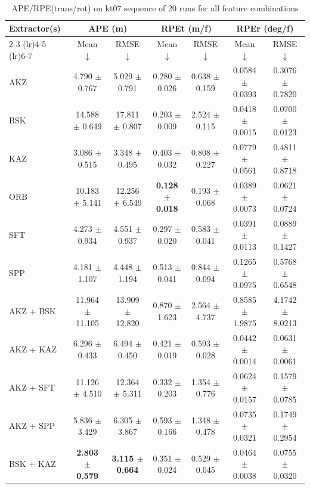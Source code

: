 \begin{table}[hbp]
\centering
\caption{APE/RPE(trans/rot) on kt07 sequence of 20 runs for all feature combinations}
\scriptsize
\label{tab:kt07_ape_rpe}\
\setlength{\tabcolsep}{3pt}
\begin{tabular}{lcccccc}
\toprule
\textbf{Extractor(s)}
& \multicolumn{2}{c}{\textbf{APE (m)}}
& \multicolumn{2}{c}{\textbf{RPEt (m/f)}}
& \multicolumn{2}{c}{\textbf{RPEr (deg/f)}} \\
\cmidrule(lr){2-3} \cmidrule(lr){4-5} \cmidrule(lr){6-7}
& Mean $\downarrow$ & RMSE $\downarrow$
& Mean $\downarrow$ & RMSE $\downarrow$
& Mean $\downarrow$ & RMSE $\downarrow$ \\
\midrule
AKZ & 4.790 $\pm$ 0.767 & 5.029 $\pm$ 0.791 & 0.280 $\pm$ 0.026 & 0.638 $\pm$ 0.159 & 0.0584 $\pm$ 0.0393 & 0.3076 $\pm$ 0.7820 \\
BSK & 14.588 $\pm$ 0.649 & 17.811 $\pm$ 0.807 & 0.203 $\pm$ 0.009 & 2.524 $\pm$ 0.115 & 0.0418 $\pm$ 0.0015 & 0.0700 $\pm$ 0.0123 \\
KAZ & 3.086 $\pm$ 0.515 & 3.348 $\pm$ 0.495 & 0.403 $\pm$ 0.032 & 0.808 $\pm$ 0.227 & 0.0779 $\pm$ 0.0561 & 0.4811 $\pm$ 0.8718 \\
ORB & 10.183 $\pm$ 5.141 & 12.256 $\pm$ 6.549 & \textbf{0.128 $\pm$ 0.018} & 0.193 $\pm$ 0.068 & 0.0389 $\pm$ 0.0073 & 0.0621 $\pm$ 0.0724 \\
SFT & 4.273 $\pm$ 0.934 & 4.551 $\pm$ 0.937 & 0.297 $\pm$ 0.020 & 0.583 $\pm$ 0.041 & 0.0391 $\pm$ 0.0113 & 0.0889 $\pm$ 0.1427 \\
SPP & 4.181 $\pm$ 1.107 & 4.448 $\pm$ 1.194 & 0.513 $\pm$ 0.041 & 0.844 $\pm$ 0.094 & 0.1265 $\pm$ 0.0975 & 0.5768 $\pm$ 0.6548 \\
AKZ + BSK & 11.964 $\pm$ 11.105 & 13.909 $\pm$ 12.820 & 0.870 $\pm$ 1.623 & 2.564 $\pm$ 4.737 & 0.8585 $\pm$ 1.9875 & 4.1742 $\pm$ 8.0213 \\
AKZ + KAZ & 6.296 $\pm$ 0.433 & 6.494 $\pm$ 0.450 & 0.421 $\pm$ 0.019 & 0.593 $\pm$ 0.028 & 0.0442 $\pm$ 0.0014 & 0.0631 $\pm$ 0.0061 \\
AKZ + SFT & 11.126 $\pm$ 4.510 & 12.364 $\pm$ 5.311 & 0.332 $\pm$ 0.203 & 1.354 $\pm$ 0.776 & 0.0624 $\pm$ 0.0157 & 0.1579 $\pm$ 0.0785 \\
AKZ + SPP & 5.836 $\pm$ 3.429 & 6.305 $\pm$ 3.867 & 0.593 $\pm$ 0.166 & 1.348 $\pm$ 0.478 & 0.0735 $\pm$ 0.0321 & 0.1749 $\pm$ 0.2954 \\
BSK + KAZ & \textbf{2.803 $\pm$ 0.579} & \textbf{3.115 $\pm$ 0.664} & 0.351 $\pm$ 0.024 & 0.529 $\pm$ 0.045 & 0.0464 $\pm$ 0.0038 & 0.0755 $\pm$ 0.0320 \\

\end{tabular}
\end{table}
